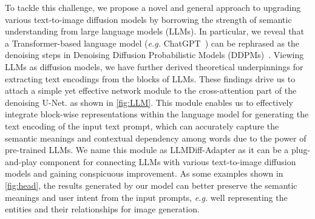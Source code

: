 To tackle this challenge, we propose a novel and general approach to upgrading various text-to-image diffusion models by borrowing the strength of semantic understanding from large language models (LLMs). In particular, we reveal that a Transformer-based language model (\emph{e.g.} ChatGPT~\cite{GPT4}) can be rephrased as the denoising steps in Denoising Diffusion Probabilistic Models (DDPMs)~\cite{DDPM}. 
Viewing LLMs as diffusion models, we have further derived theoretical underpinnings for extracting text encodings from the blocks of LLMs.
These findings drive us to attach a simple yet effective network module to the cross-attention part of the denoising U-Net.
as shown in \cref{fig:LLM}. This module enables us to effectively integrate block-wise representations within the language model for generating the text encoding of the input text prompt, which can accurately capture the semantic meanings and contextual dependency among words due to the power of pre-trained LLMs. We name this module as LLMDiff-Adapter as it can be a plug-and-play component for connecting LLMs with various text-to-image diffusion models and gaining conspicuous improvement. As some examples shown in \cref{fig:head}, the results generated by our model can better preserve the semantic meanings and user intent from the input prompts, \emph{e.g.} well representing the entities and their relationships for image generation. 


